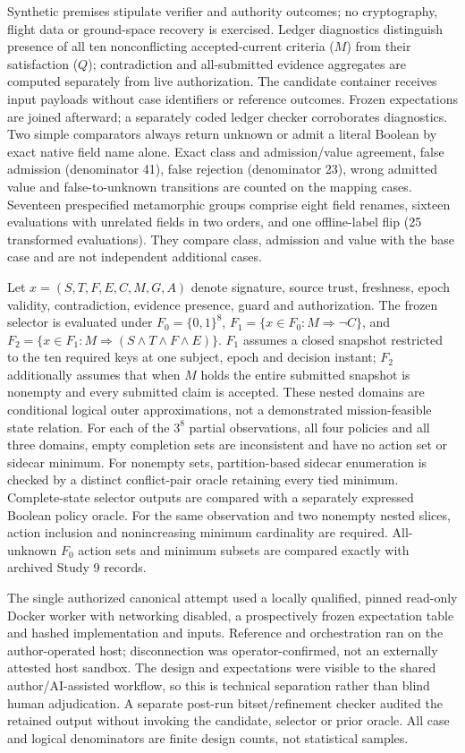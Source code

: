 \documentclass[preprint,12pt]{elsarticle}
\begin{document}
Synthetic premises stipulate verifier and authority outcomes; no cryptography, flight data or ground-space recovery is exercised. Ledger diagnostics distinguish presence of all ten nonconflicting accepted-current criteria ($M$) from their satisfaction ($Q$); contradiction and all-submitted evidence aggregates are computed separately from live authorization. The candidate container receives input payloads without case identifiers or reference outcomes. Frozen expectations are joined afterward; a separately coded ledger checker corroborates diagnostics. Two simple comparators always return unknown or admit a literal Boolean by exact native field name alone. Exact class and admission/value agreement, false admission (denominator 41), false rejection (denominator 23), wrong admitted value and false-to-unknown transitions are counted on the mapping cases. Seventeen prespecified metamorphic groups comprise eight field renames, sixteen evaluations with unrelated fields in two orders, and one offline-label flip (25 transformed evaluations). They compare class, admission and value with the base case and are not independent additional cases.

Let $x=(S,T,F,E,C,M,G,A)$ denote signature, source trust, freshness, epoch validity, contradiction, evidence presence, guard and authorization. The frozen selector is evaluated under $F_0=\{0,1\}^8$, $F_1=\{x\in F_0:M\Rightarrow\neg C\}$, and $F_2=\{x\in F_1:M\Rightarrow(S\land T\land F\land E)\}$. $F_1$ assumes a closed snapshot restricted to the ten required keys at one subject, epoch and decision instant; $F_2$ additionally assumes that when $M$ holds the entire submitted snapshot is nonempty and every submitted claim is accepted. These nested domains are conditional logical outer approximations, not a demonstrated mission-feasible state relation. For each of the $3^8$ partial observations, all four policies and all three domains, empty completion sets are inconsistent and have no action set or sidecar minimum. For nonempty sets, partition-based sidecar enumeration is checked by a distinct conflict-pair oracle retaining every tied minimum. Complete-state selector outputs are compared with a separately expressed Boolean policy oracle. For the same observation and two nonempty nested slices, action inclusion and nonincreasing minimum cardinality are required. All-unknown $F_0$ action sets and minimum subsets are compared exactly with archived Study 9 records.

The single authorized canonical attempt used a locally qualified, pinned read-only Docker worker with networking disabled, a prospectively frozen expectation table and hashed implementation and inputs. Reference and orchestration ran on the author-operated host; disconnection was operator-confirmed, not an externally attested host sandbox. The design and expectations were visible to the shared author/AI-assisted workflow, so this is technical separation rather than blind human adjudication. A separate post-run bitset/refinement checker audited the retained output without invoking the candidate, selector or prior oracle. All case and logical denominators are finite design counts, not statistical samples.
\end{document}
